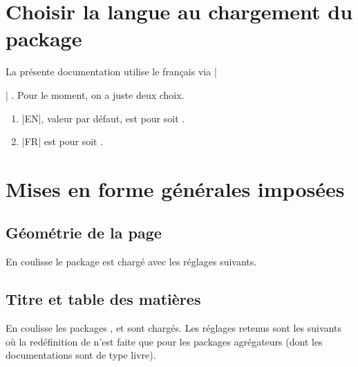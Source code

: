 \documentclass[12pt,a4paper]{article}
\begin{document}
\section{Choisir la langue au chargement du package}

La présente documentation utilise le français via \docilatex|\usepackage[lang = FR]{bdoc}| .
Pour le moment, on a juste deux choix.

\begin{enumerate}
	\item \docilatex|EN|, valeur par défaut, est pour  soit .

	\item \docilatex|FR| est pour  soit .
\end{enumerate}




\section{Mises en forme générales imposées}

\subsection{Géométrie de la page}

En coulisse le package  est chargé avec les réglages suivants.

\begin{doclatex-alone}
\RequirePackage[
    top            = 2.5cm,
    bottom         = 2.5cm,
    left           = 2.5cm,
    right          = 2.5cm,
    marginparwidth = 2cm, 
    marginparsep   = 2mm,
    heightrounded
]{geometry}
\end{doclatex-alone}




\subsection{Titre et table des matières}

En coulisse les packages ,  et  sont chargés. Les réglages retenus sont les suivants où la redéfinition de  n'est faite que pour les packages agrégateurs (dont les documentations sont de type livre).
\end{document}
